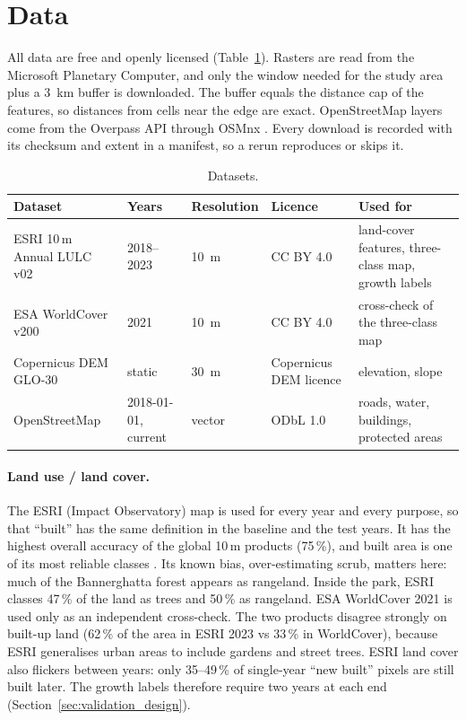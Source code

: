 \section{Data}\label{sec:data}

All data are free and openly licensed (Table~\ref{tab:data}). Rasters are read from the Microsoft
Planetary Computer, and only the window needed for the study area plus a \SI{3}{\km} buffer is
downloaded. The buffer equals the distance cap of the features, so distances from cells near the
edge are exact. OpenStreetMap layers come from the Overpass API through OSMnx \citep{boeing2017}.
Every download is recorded with its checksum and extent in a manifest, so a rerun reproduces or
skips it.

\begin{table}[ht]
  \centering\small
  \caption{Datasets.}
  \label{tab:data}
  \begin{tabularx}{\textwidth}{@{}X l l l X@{}}
    \toprule
    Dataset & Years & Resolution & Licence & Used for \\
    \midrule
    ESRI 10\,m Annual LULC v02 \citep{karra2021} & 2018--2023 & \SI{10}{\m} & CC BY 4.0 &
      land-cover features, three-class map, growth labels \\
    ESA WorldCover v200 \citep{zanaga2022} & 2021 & \SI{10}{\m} & CC BY 4.0 &
      cross-check of the three-class map \\
    Copernicus DEM GLO-30 \citep{copdem} & static & \SI{30}{\m} & Copernicus DEM licence &
      elevation, slope \\
    OpenStreetMap \citep{osm} & 2018-01-01, current & vector & ODbL 1.0 &
      roads, water, buildings, protected areas \\
    \bottomrule
  \end{tabularx}
\end{table}

\paragraph{Land use / land cover.} The ESRI (Impact Observatory) map is used for every year and
every purpose, so that ``built'' has the same definition in the baseline and the test years. It
has the highest overall accuracy of the global 10\,m products (75\,\%), and built area is one of
its most reliable classes \citep{venter2022}. Its known bias, over-estimating scrub, matters
here: much of the Bannerghatta forest appears as rangeland. Inside the park, ESRI classes 47\,\%
of the land as trees and 50\,\% as rangeland. ESA WorldCover 2021 is used only as an independent
cross-check. The two products disagree strongly on built-up land (62\,\% of the area in ESRI 2023
vs 33\,\% in WorldCover), because ESRI generalises urban areas to include gardens and street
trees. ESRI land cover also flickers between years: only 35--49\,\% of single-year ``new built''
pixels are still built later. The growth labels therefore require two years at each end
(Section~\ref{sec:validation_design}).


